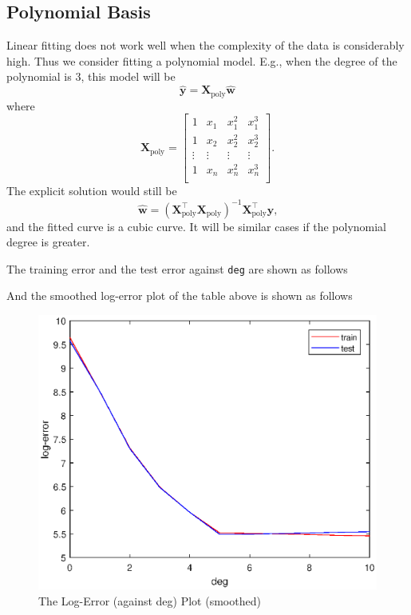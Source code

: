 \documentclass[10pt]{article}
\begin{document}
\subsection{Polynomial Basis}
Linear fitting does not work well when the complexity of the data is considerably high. Thus we consider fitting a polynomial model. E.g., when the degree of the polynomial is $3$, this model will be
$$\hat{\mathbf{y}} = \mathbf{X}_{\text{poly}}\hat{\mathbf{w}}$$
where
$$\mathbf{X}_{\text{poly}} = \begin{bmatrix}
1 & x_1 & x_1^2 & x_1^3 \\
1 & x_2 & x_2^2 & x_2^3 \\
\vdots & \vdots & \vdots & \vdots \\
1 & x_n & x_n^2 & x_n^3 \\
\end{bmatrix}\text{.}$$
The explicit solution would still be
$$\hat{\mathbf{w}} = \left(\mathbf{X}_{\text{poly}}^\intercal\mathbf{X}_{\text{poly}}\right)^{-1}\mathbf{X}_{\text{poly}}^\intercal\mathbf{y}\text{,}$$
and the fitted curve is a cubic curve. It will be similar cases if the polynomial degree is greater.\par
The training error and the test error against \texttt{deg} are shown as follows
\begin{center}
\end{center}
And the smoothed log-error plot of the table above is shown as follows
\begin{figure}[H]
\centering
\includegraphics[scale=.65]{plot1_2.eps}
\caption{The Log-Error (against deg) Plot (smoothed)}
\label{plot1_1}
\end{figure}
\end{document}
